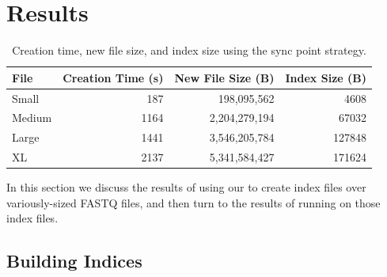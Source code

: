 \section{Results}
\label{sec:results}

\begin{table}[ht]
    \centering
    \caption{Creation time, new file size, and index size using the sync point
    strategy.}
\begin{tabular}{l|r|r|r}
   
    File & Creation Time (s) & New File Size (B) & Index Size (B)\\
    \hline
    Small & 187 & 198,095,562 &  4608\\
    Medium & 1164 & 2,204,279,194 &  67032\\
    Large & 1441 &  3,546,205,784 &127848\\
    XL & 2137 & 5,341,584,427 & 171624\\
\end{tabular}
    \label{tab:sync}
\end{table}


In this section we discuss the results of using our \ibuilder to create index
files over variously-sized \gzip FASTQ files, and then turn to the results of
running \ireader on those index files.

\subsection{Building Indices}
\label{sec:buildresults}

